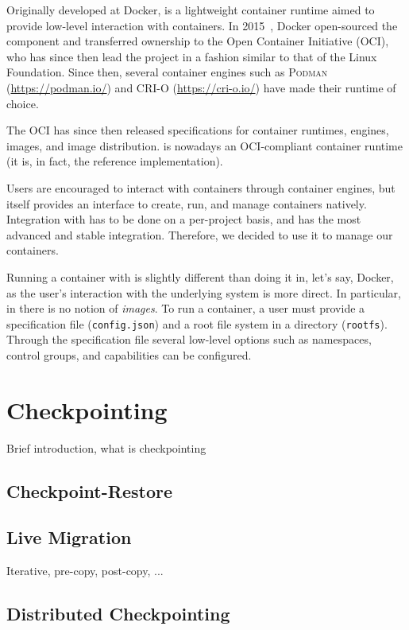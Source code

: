 Originally developed at Docker, \runc is a lightweight container runtime aimed to provide low-level interaction with containers.
In 2015~\cite{introducing-runc}, Docker open-sourced the component and transferred ownership to the Open Container Initiative (OCI), who has since then lead the project in a fashion similar to that of the Linux Foundation.
Since then, several container engines such as \textsc{Podman} (\url{https://podman.io/}) and \textsc{CRI-O} (\url{https://cri-o.io/}) have made \runc their runtime of choice.

The OCI has since then released specifications for container runtimes, engines, images, and image distribution.
\runc is nowadays an OCI-compliant container runtime (it is, in fact, the reference implementation).

Users are encouraged to interact with containers through container engines, but \runc itself provides an interface to create, run, and manage containers natively.
Integration with \criu has to be done on a per-project basis, and \runc has the most advanced and stable integration.
Therefore, we decided to use it to manage our containers.

Running a container with \runc is slightly different than doing it in, let's say, Docker, as the user's interaction with the underlying system is more direct.
In particular, in \runc there is no notion of \textit{images}.
To run a container, a user must provide a specification file (\texttt{config.json}) and a root file system in a directory (\texttt{rootfs}).
Through the specification file several low-level options such as namespaces, control groups, and capabilities can be configured.

\section{Checkpointing}

Brief introduction, what is checkpointing

\subsection{Checkpoint-Restore}

\subsection{Live Migration}

Iterative, pre-copy, post-copy, ... \cite{Clark2005}

\subsection{Distributed Checkpointing}

